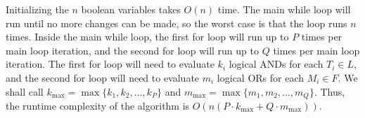 \documentclass{article}
\begin{document}
Initializing the $n$ boolean variables takes $O(n)$ time.
The main while loop will run until no more changes can be made, so the worst case is that the loop runs $n$ times.
Inside the main while loop, the first for loop will run up to $P$ times per main loop iteration, and the second for loop will run up to $Q$ times per main loop iteration.
The first for loop will need to evaluate $k_i$ logical ANDs for each $T_i \in L$, and the second for loop will need to evaluate $m_i$ logical ORs for each $M_i \in F$.
We shall call $k_{\text{max}} = \max\{k_1, k_2, \ldots, k_P\}$ and $m_{\text{max}} = \max\{m_1, m_2, \ldots, m_Q\}$.
Thus, the runtime complexity of the algorithm is $O(n (P \cdot k_{\text{max}} + Q \cdot m_{\text{max}}))$.
\end{document}
